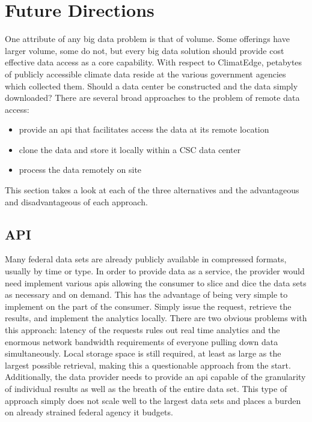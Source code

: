 \section{Future Directions}
One attribute of any big data problem is that of volume. Some offerings have larger volume, some do not, but every big data solution should provide cost effective data access as a core capability. With respect to ClimatEdge\texttrademark{}, petabytes of publicly accessible climate data reside at the various government agencies which collected them. Should a data center be constructed and the data simply  downloaded? There are several broad approaches to the problem of remote data access:
\begin{itemize}
    \item provide an \gls{api} that facilitates access the data at its remote location
    \item clone the data and store it locally within a \textsc{CSC} data center
    \item process the data remotely on site
\end{itemize}
This section takes a look at each of the three alternatives and the advantageous and disadvantageous of each approach.
\subsection{API}
Many federal data sets are already publicly available in compressed formats, usually by time or type. In order to provide data as a service, the provider would need implement various \gls{api}s allowing the consumer to slice and dice the data sets as necessary and on demand. This has the advantage of being very simple to implement on the part of the consumer. Simply issue the request, retrieve the results, and implement the analytics locally. There are two obvious problems with this approach: latency of the requests rules out real time analytics and the enormous network bandwidth requirements of everyone pulling down data simultaneously. Local storage space is still required, at least as large as the largest possible retrieval, making this a questionable approach from the start. Additionally, the data provider needs to provide an \gls{api} capable of the granularity of individual results as well as the breath of the entire data set. This type of approach simply does not scale well to the largest data sets and places a burden on already strained federal agency \gls{it} budgets.
